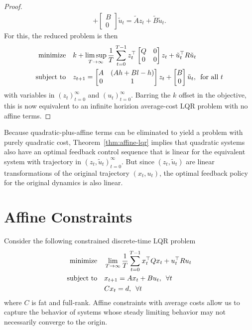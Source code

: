 \documentclass[12pt]{article}
\begin{document}
\begin{proof}
\begin{align*}
        + \begin{bmatrix} B \\ 0 \end{bmatrix}
          \tilde{u}_t
      = \tilde{A} z_t + \tilde{B} \tilde{u}_t.
  \end{align*}
  For this, the reduced problem is then
  \begin{align*}
    \text{minimize}
      &\quad k + \limsup_{T \to \infty} \frac{1}{T} \sum_{t = 0}^{T - 1}
        z_t ^\top \begin{bmatrix} Q & 0 \\ 0 & 0 \end{bmatrix} z_t
        + \tilde{u}_t ^\top R \tilde{u}_t \\
    \text{subject to}
      &\quad z_{t + 1}
        = \begin{bmatrix} A & (Ah + Bl - h) \\ 0 & 1 \end{bmatrix}
          z_t
          + \begin{bmatrix} B \\ 0 \end{bmatrix}
          \tilde{u}_t, \enskip \text{for all \(t\)}
  \end{align*}
  with variables in \((z_t)_{t = 0}^{\infty}\)
  and \((u_t)_{t = 0}^{\infty}\).
  Barring the \(k\) offset in the objective,
  this is now equivalent to an infinite horizion average-cost
  LQR problem with no affine terms.
\end{proof}

Because quadratic-plus-affine terms can be eliminated to yield
a problem with purely quadratic cost,
Theorem~\ref{thm:affine-lqr} implies that
quadratic systems also have an optimal feedback control sequence
that is linear for the equivalent system with
trajectory in \((z_t, \tilde{u}_t)_{t = 0}^{\infty}\).
But since \((z_t, \tilde{u}_t)\) are linear transformations of
the original trajectory \((x_t, u_t)\),
the optimal feedback policy for the original dynamics is also linear.


\section{Affine Constraints}

Consider the following constrained discrete-time LQR problem
\begin{align*}
  \text{minimize}
    &\quad \lim_{T \to \infty} \frac{1}{T}
      \sum_{t = 0}^{T - 1} x_t ^\top Q x_t + u_t ^\top R u_t \\
  \text{subject to}
    &\quad x_{t + 1} = A x_t + B u_t, \enskip \forall t \\
    &\quad C x_t = d, \enskip \forall t
\end{align*}
where \(C\) is fat and full-rank.
Affine constraints with average costs allow us to capture
the behavior of systems whose steady limiting behavior
may not necessarily converge to the origin.
\end{document}
